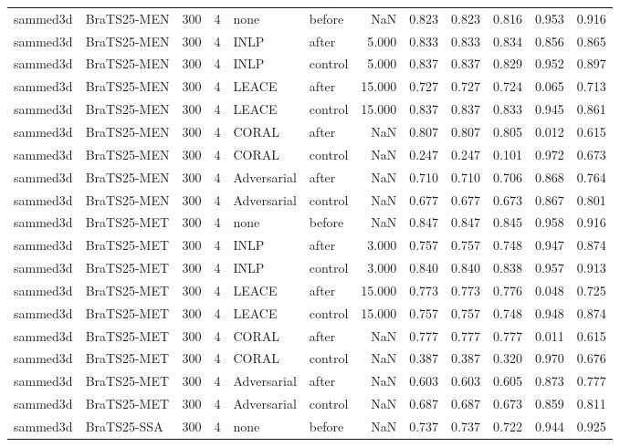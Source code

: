 \begin{tabular}{llrrllrrrrrr}
sammed3d & BraTS25-MEN & 300 & 4 & none & before & NaN & 0.823 & 0.823 & 0.816 & 0.953 & 0.916 \\
sammed3d & BraTS25-MEN & 300 & 4 & INLP & after & 5.000 & 0.833 & 0.833 & 0.834 & 0.856 & 0.865 \\
sammed3d & BraTS25-MEN & 300 & 4 & INLP & control & 5.000 & 0.837 & 0.837 & 0.829 & 0.952 & 0.897 \\
sammed3d & BraTS25-MEN & 300 & 4 & LEACE & after & 15.000 & 0.727 & 0.727 & 0.724 & 0.065 & 0.713 \\
sammed3d & BraTS25-MEN & 300 & 4 & LEACE & control & 15.000 & 0.837 & 0.837 & 0.833 & 0.945 & 0.861 \\
sammed3d & BraTS25-MEN & 300 & 4 & CORAL & after & NaN & 0.807 & 0.807 & 0.805 & 0.012 & 0.615 \\
sammed3d & BraTS25-MEN & 300 & 4 & CORAL & control & NaN & 0.247 & 0.247 & 0.101 & 0.972 & 0.673 \\
sammed3d & BraTS25-MEN & 300 & 4 & Adversarial & after & NaN & 0.710 & 0.710 & 0.706 & 0.868 & 0.764 \\
sammed3d & BraTS25-MEN & 300 & 4 & Adversarial & control & NaN & 0.677 & 0.677 & 0.673 & 0.867 & 0.801 \\
sammed3d & BraTS25-MET & 300 & 4 & none & before & NaN & 0.847 & 0.847 & 0.845 & 0.958 & 0.916 \\
sammed3d & BraTS25-MET & 300 & 4 & INLP & after & 3.000 & 0.757 & 0.757 & 0.748 & 0.947 & 0.874 \\
sammed3d & BraTS25-MET & 300 & 4 & INLP & control & 3.000 & 0.840 & 0.840 & 0.838 & 0.957 & 0.913 \\
sammed3d & BraTS25-MET & 300 & 4 & LEACE & after & 15.000 & 0.773 & 0.773 & 0.776 & 0.048 & 0.725 \\
sammed3d & BraTS25-MET & 300 & 4 & LEACE & control & 15.000 & 0.757 & 0.757 & 0.748 & 0.948 & 0.874 \\
sammed3d & BraTS25-MET & 300 & 4 & CORAL & after & NaN & 0.777 & 0.777 & 0.777 & 0.011 & 0.615 \\
sammed3d & BraTS25-MET & 300 & 4 & CORAL & control & NaN & 0.387 & 0.387 & 0.320 & 0.970 & 0.676 \\
sammed3d & BraTS25-MET & 300 & 4 & Adversarial & after & NaN & 0.603 & 0.603 & 0.605 & 0.873 & 0.777 \\
sammed3d & BraTS25-MET & 300 & 4 & Adversarial & control & NaN & 0.687 & 0.687 & 0.673 & 0.859 & 0.811 \\
sammed3d & BraTS25-SSA & 300 & 4 & none & before & NaN & 0.737 & 0.737 & 0.722 & 0.944 & 0.925 \\

\end{tabular}
